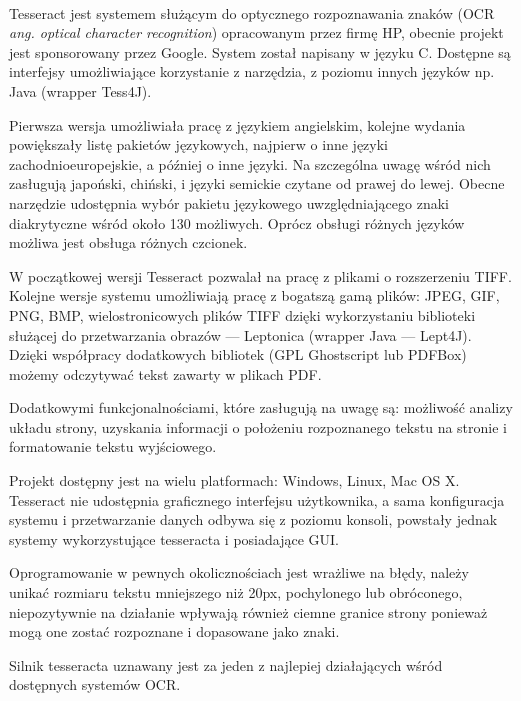 \documentclass[a4paper,12pt]{article}
\begin{document}
	    \paragraph{\indent} Tesseract jest systemem służącym do optycznego rozpoznawania znaków (OCR \textit{ang. optical character recognition}) 
			opracowanym przez firmę HP, obecnie projekt jest sponsorowany przez Google. System został napisany w języku C. 
			Dostępne są interfejsy umożliwiające korzystanie z narzędzia, z poziomu innych języków np. Java (wrapper Tess4J). 
			\par Pierwsza wersja umożliwiała pracę z językiem angielskim, kolejne wydania powiększały listę pakietów językowych, 
			najpierw o inne języki zachodnioeuropejskie, a później o inne języki. Na szczególna uwagę wśród nich zasługują japoński, chiński, 
			i języki semickie czytane od prawej do lewej. Obecne narzędzie udostępnia wybór pakietu językowego uwzględniającego 
			znaki diakrytyczne wśród około 130 możliwych. Oprócz obsługi różnych języków możliwa jest obsługa różnych czcionek. 
			\par W początkowej wersji Tesseract pozwalał na pracę z plikami o rozszerzeniu TIFF. Kolejne wersje systemu umożliwiają pracę z bogatszą gamą plików: 
			JPEG, GIF, PNG, BMP, wielostronicowych plików TIFF dzięki wykorzystaniu biblioteki służącej do przetwarzania obrazów --- Leptonica 
			(wrapper Java --- Lept4J). Dzięki współpracy dodatkowych bibliotek (GPL Ghostscript lub PDFBox) możemy odczytywać tekst zawarty w plikach PDF. 
			\par Dodatkowymi funkcjonalnościami, które zasługują na uwagę są: możliwość analizy układu strony, uzyskania informacji o położeniu rozpoznanego tekstu na stronie 
			i formatowanie tekstu wyjściowego. 
			\par Projekt dostępny jest na wielu platformach: Windows, Linux, Mac OS X. Tesseract nie udostępnia graficznego interfejsu użytkownika, 
			a sama konfiguracja systemu i przetwarzanie danych odbywa się z poziomu konsoli, powstały jednak systemy wykorzystujące tesseracta i posiadające GUI. 
			\par Oprogramowanie w pewnych okolicznościach jest wrażliwe na błędy, należy unikać rozmiaru tekstu mniejszego niż 20px, pochylonego lub obróconego, 
			niepozytywnie na działanie wpływają również ciemne granice strony ponieważ mogą one zostać rozpoznane i dopasowane jako znaki.
	    \par Silnik tesseracta uznawany jest za jeden z najlepiej działających wśród dostępnych systemów OCR. 
\end{document}
